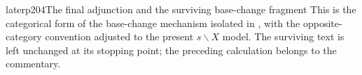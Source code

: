 \begin{dcomment}{later}{p204}{The final adjunction and the surviving base-change fragment}
This is the categorical form of the base-change mechanism isolated in \citet[Proposition~5.3, Theorem~5.4, and Remark~5.5]{Maltsiniotis2005Asphericite}, with the opposite-category convention adjusted to the present $s\backslash X$ model. The surviving text is left unchanged at its stopping point; the preceding calculation belongs to the commentary.
\end{dcomment}
